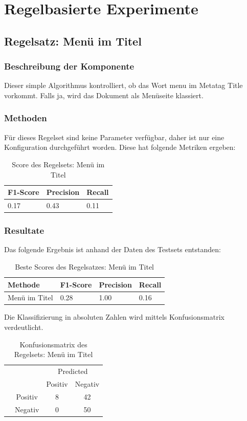 \section{Regelbasierte Experimente}
\subsection{Regelsatz: Menü im Titel}
\subsubsection{Beschreibung der Komponente}
Dieser simple Algorithmus kontrolliert, ob das Wort \glqq menu\grqq{} im Metatag \glqq Title\grqq{} vorkommt.
Falls ja, wird das Dokument als Menüseite klassiert.
\subsubsection{Methoden}
Für dieses Regelset sind keine Parameter verfügbar, daher ist nur eine Konfiguration durchgeführt worden.
Diese hat folgende Metriken ergeben:\\
\begin{table}[H]
	\caption{Score des Regelsets: Menü im Titel}
	\centering
	\begin{tabular}{|l|l|l|}
		\hline
		F1-Score & Precision & Recall\\
		\hline
		0.17 & 0.43 & 0.11  \\
		\hline
	\end{tabular}
\end{table}
\subsubsection{Resultate}
Das folgende Ergebnis ist anhand der Daten des Testsets entstanden:
\begin{table}[H]
	\caption{Beste Scores des Regelsatzes: Menü im Titel}
	\centering
	\begin{tabular}{|l|l|l|l|}
		\hline
		Methode & F1-Score & Precision & Recall\\
		\hline
		Menü im Titel & 0.28 & 1.00 & 0.16 \\
		\hline
	\end{tabular}
\end{table}
Die Klassifizierung in absoluten Zahlen wird mittels Konfusionsmatrix verdeutlicht.
\begin{table}[H]
	\caption{Konfusionsmatrix des Regelsets: Menü im Titel}
	\centering
	\begin{tabular}{@{}cc|cc@{}}
		\multicolumn{1}{c}{} &\multicolumn{1}{c}{} &\multicolumn{2}{c}{Predicted} \\ 
		\multicolumn{1}{c}{} & 
		\multicolumn{1}{c|}{} & 
		\multicolumn{1}{c}{Positiv} & 
		\multicolumn{1}{c}{Negativ} \\ 
		\cline{2-4}
		\multirow[c]{2}{*}{\rotatebox[origin=tr]{90}{Actual}}
		& Positiv  & 8   & 42   \\[1.5ex]
		& Negativ  & 0   & 50 \\ 
		\cline{2-4}
	\end{tabular}
\end{table}
